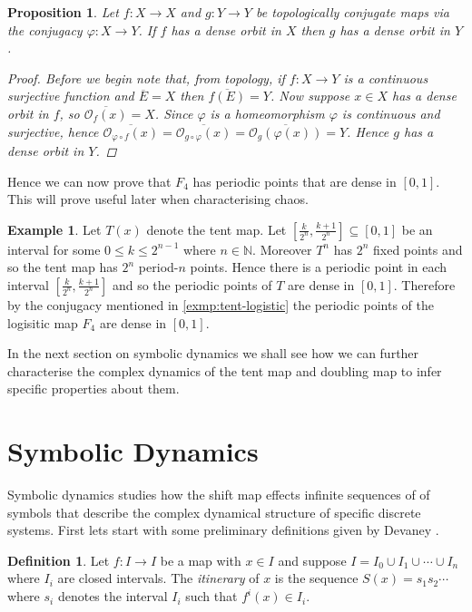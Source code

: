 \documentclass[11pt,a4paper,oneside]{memoir}
\theoremstyle{plain}
\newtheorem{prop}[thm]{Proposition}
\theoremstyle{definition}
\newtheorem{defn}[thm]{Definition}
\newtheorem{exmp}[thm]{Example}
\begin{document}
\begin{prop}
    Let $f: X \to X$ and $g: Y \to Y$ be topologically conjugate maps via the conjugacy $\varphi: X \to Y$. If $f$ has a dense orbit in $X$ then $g$ has a dense orbit in $Y$.
    \begin{proof}
        Before we begin note that, from topology, if $f: X \to Y$ is a continuous surjective function and $\overline{E} = X$ then $\overline{f(E)} = Y$. Now suppose $x \in X$ has a dense orbit in $f$, so $\overline{\mathcal{O}_f(x)} = X$. Since $\varphi$ is a homeomorphism $\varphi$ is continuous and surjective, hence $\overline{\mathcal{O}_{\varphi \circ f}(x)} = \overline{\mathcal{O}_{g \circ \varphi}(x)} = \overline{\mathcal{O}_{g}(\varphi(x))} = Y$. Hence $g$ has a dense orbit in $Y$.
    \end{proof}
\end{prop}

Hence we can now prove that $F_4$ has periodic points that are dense in $[0, 1]$. This will prove useful later when characterising chaos.

\begin{exmp} \label{exmp:logisitc-periodic-dense}
    Let $T(x)$ denote the tent map. Let $\left[\frac{k}{2^n}, \frac{k+1}{2^n}\right] \subseteq [0, 1]$ be an interval for some $0 \leq k \leq 2^{n-1}$ where $n \in \mathbb{N}$. Moreover $T^n$ has $2^n$ fixed points and so the tent map has $2^n$ period-$n$ points. Hence there is a periodic point in each interval $\left[\frac{k}{2^n}, \frac{k+1}{2^n}\right]$ and so the periodic points of $T$ are dense in $[0, 1]$. Therefore by the conjugacy mentioned in \ref{exmp:tent-logistic} the periodic points of the logisitic map $F_4$ are dense in $[0, 1]$.
\end{exmp}

In the next section on symbolic dynamics we shall see how we can further characterise the complex dynamics of the tent map and doubling map to infer specific properties about them.

\section{Symbolic Dynamics}
Symbolic dynamics studies how the shift map effects infinite sequences of of symbols that describe the complex dynamical structure of specific discrete systems. First lets start with some preliminary definitions given by Devaney \cite[Section 1.6]{devaney}.

\begin{defn}
    Let $f: I \to I$ be a map with $x \in I$ and suppose $I = I_0 \cup I_1 \cup \cdots \cup I_n$ where $I_i$ are closed intervals. The \emph{itinerary} of $x$ is the sequence $S(x) = s_1s_2\cdots$ where $s_i$ denotes the interval $I_i$ such that $f^i(x) \in I_i$.
\end{defn}
\end{document}
